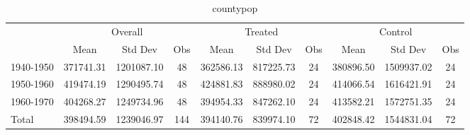 \begin{table}[htbp]\centering
\def\sym#1{\ifmmode^{#1}\else\(^{#1}\)\fi}
\caption{countypop \label{tab1}}
\begin{tabular}{l*{3}{ccc}}
\toprule
                    &\multicolumn{3}{c}{Overall}           &\multicolumn{3}{c}{Treated}           &\multicolumn{3}{c}{Control}           \\
                    &        Mean&     Std Dev&         Obs&        Mean&     Std Dev&         Obs&        Mean&     Std Dev&         Obs\\
\midrule
1940-1950           &   371741.31&  1201087.10&          48&   362586.13&   817225.73&          24&   380896.50&  1509937.02&          24\\
1950-1960           &   419474.19&  1290495.74&          48&   424881.83&   888980.02&          24&   414066.54&  1616421.91&          24\\
1960-1970           &   404268.27&  1249734.96&          48&   394954.33&   847262.10&          24&   413582.21&  1572751.35&          24\\
Total               &   398494.59&  1239046.97&         144&   394140.76&   839974.10&          72&   402848.42&  1544831.04&          72\\
\bottomrule
\end{tabular}
\end{table}
